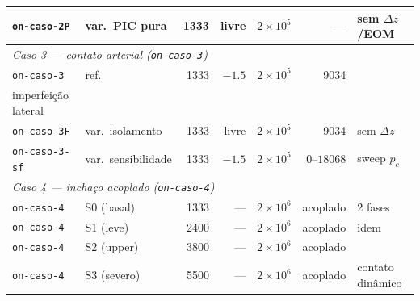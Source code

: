 \documentclass[article, hidelinks,oneside,12pt]{abntex2}
\begin{document}
\begin{table}[h!]
\begin{tabular}{l l r r r r l}
\texttt{on-caso-2P} & var.\ PIC pura & 1333 & livre & $2\times10^5$ & --- & sem $\Delta z$/EOM \\
\midrule
\multicolumn{7}{l}{\textit{Caso 3 --- contato arterial (\texttt{on-caso-3})}} \\
\texttt{on-caso-3} & ref. & 1333 & $-1.5$ & $2\times10^5$ & 9034 & \makecell{\texttt{contact\_local} ($+x$);\\imperfeição lateral} \\
\texttt{on-caso-3F} & var.\ isolamento & 1333 & livre & $2\times10^5$ & 9034 & sem $\Delta z$ \\
\texttt{on-caso-3-sf} & var.\ sensibilidade & 1333 & $-1.5$ & $2\times10^5$ & $0\text{--}18068$ & sweep $p_c$ \\
\midrule
\multicolumn{7}{l}{\textit{Caso 4 --- inchaço acoplado (\texttt{on-caso-4})}} \\
\texttt{on-caso-4} & S0 (basal) & 1333 & --- & $2\times10^6$ & acoplado & 2 fases \\
\texttt{on-caso-4} & S1 (leve) & 2400 & --- & $2\times10^6$ & acoplado & idem \\
\texttt{on-caso-4} & S2 (upper) & 3800 & --- & $2\times10^6$ & acoplado & \cite{lawley2017} \\
\texttt{on-caso-4} & S3 (severo) & 5500 & --- & $2\times10^6$ & acoplado & contato dinâmico \\
\bottomrule
\end{tabular}
\end{table}



\end{document}
